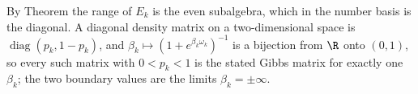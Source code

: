By Theorem  the range of $E_k$ is the even subalgebra, which in the number basis is the diagonal. A diagonal density matrix on a two-dimensional space is $\operatorname{diag}(p_k, 1 - p_k)$, and $\beta_k \mapsto (1 + e^{\beta_k\omega_k})^{-1}$ is a bijection from $\R$ onto $(0,1)$, so every such matrix with $0 < p_k < 1$ is the stated Gibbs matrix for exactly one $\beta_k$; the two boundary values are the limits $\beta_k = \pm\infty$.
